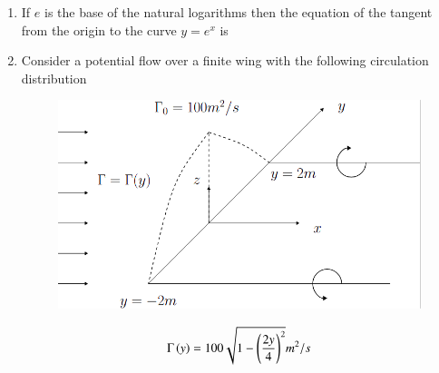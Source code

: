 \documentclass[journal]{IEEEtran}
\begin{document}
\begin{enumerate}
\begin{enumerate}
\end{enumerate}
\item If $e$ is the base of the natural logarithms then the equation of the tangent from the origin to the curve $y=e^x$ is
	\begin{enumerate}
\end{enumerate}
\item Consider a potential flow over a finite wing with the following circulation distribution
\begin{figure}[H]
			\centering
			\includegraphics[scale=0.4]{figs/q46.png}
			\label{stemplot}
		\end{figure}
\begin{align*}
	\Gamma\left(y\right)=100\sqrt{1-\left(\frac{2y}{4}\right)^2} m^2/s
\end{align*}
	\begin{enumerate}
\end{enumerate}
\end{enumerate}
\end{document}
